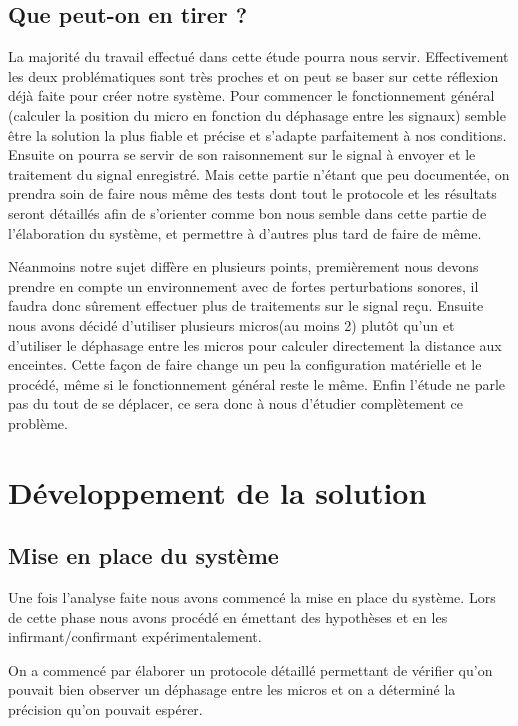 \documentclass[12pt,a4paper]{report}
\begin{document}
\section{Que peut-on en tirer ?}

La majorité du travail effectué dans cette étude pourra nous servir. Effectivement les  deux problématiques sont très proches et on peut se baser sur cette réflexion déjà faite pour créer notre système.
Pour commencer le fonctionnement général (calculer la position du micro en fonction du déphasage entre les signaux) semble être la solution la plus fiable et précise et s'adapte parfaitement à nos conditions.
Ensuite on pourra se servir de son raisonnement sur le signal à envoyer et le traitement du signal enregistré. Mais cette partie n'étant que peu documentée, on prendra soin de faire nous même des tests dont tout le protocole et les résultats seront détaillés afin de s'orienter comme bon nous semble dans cette partie de l'élaboration du système, et permettre à d'autres plus tard de faire de même.

Néanmoins notre sujet diffère en plusieurs points, premièrement nous devons prendre en compte un environnement avec de fortes perturbations sonores, il faudra donc sûrement effectuer plus de traitements sur le signal reçu. Ensuite nous avons décidé d'utiliser plusieurs micros(au moins 2) plutôt qu'un et d'utiliser le déphasage entre les micros pour calculer directement la distance aux enceintes. Cette façon de faire change un peu la configuration matérielle et le procédé, même si le fonctionnement général reste le même. Enfin l'étude ne parle pas du tout de se déplacer, ce sera donc à nous d'étudier complètement ce problème.


\chapter{Développement de la solution}
\section{Mise en place du système}

Une fois l'analyse faite nous avons commencé la mise en place du système.
Lors de cette phase nous avons procédé en émettant des hypothèses et en les infirmant/confirmant expérimentalement. 


On a commencé par élaborer un protocole détaillé permettant de vérifier qu'on pouvait bien observer un déphasage entre les micros et on a déterminé la précision qu'on pouvait espérer.
\end{document}
